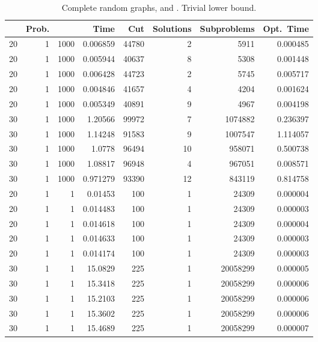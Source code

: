 \documentclass[a4paper,11pt]{article}
\begin{document}
\begin{table}
\begin{center}
\begin{tabular}{|rrr|r|r|rr|r|}
\hline
 & Prob. &  & Time & Cut & Solutions & Subproblems & Opt.\ Time \\
\hline
20 & 1 & 1000 & 0.006859 & 44780 & 2 & 5911 & 0.000485 \\
20 & 1 & 1000 & 0.005944 & 40637 & 8 & 5308 & 0.001448 \\
20 & 1 & 1000 & 0.006428 & 44723 & 2 & 5745 & 0.005717 \\
20 & 1 & 1000 & 0.004846 & 41657 & 4 & 4204 & 0.001624 \\
20 & 1 & 1000 & 0.005349 & 40891 & 9 & 4967 & 0.004198 \\
30 & 1 & 1000 & 1.20566 & 99972 & 7 & 1074882 & 0.236397 \\
30 & 1 & 1000 & 1.14248 & 91583 & 9 & 1007547 & 1.114057 \\
30 & 1 & 1000 & 1.0778 & 96494 & 10 & 958071 & 0.500738 \\
30 & 1 & 1000 & 1.08817 & 96948 & 4 & 967051 & 0.008571 \\
30 & 1 & 1000 & 0.971279 & 93390 & 12 & 843119 & 0.814758 \\
\hline
20 & 1 & 1 & 0.01453 & 100 & 1 & 24309 & 0.000004 \\
20 & 1 & 1 & 0.014483 & 100 & 1 & 24309 & 0.000003 \\
20 & 1 & 1 & 0.014618 & 100 & 1 & 24309 & 0.000004 \\
20 & 1 & 1 & 0.014633 & 100 & 1 & 24309 & 0.000003 \\
20 & 1 & 1 & 0.014174 & 100 & 1 & 24309 & 0.000003 \\
30 & 1 & 1 & 15.0829 & 225 & 1 & 20058299 & 0.000005 \\
30 & 1 & 1 & 15.3418 & 225 & 1 & 20058299 & 0.000006 \\
30 & 1 & 1 & 15.2103 & 225 & 1 & 20058299 & 0.000006 \\
30 & 1 & 1 & 15.3602 & 225 & 1 & 20058299 & 0.000006 \\
30 & 1 & 1 & 15.4689 & 225 & 1 & 20058299 & 0.000007 \\
\hline
\end{tabular}
\end{center}
\caption{Complete random graphs,  and
  . Trivial lower bound.}
\label{tab:complete-norebal}
\end{table}
\end{document}
